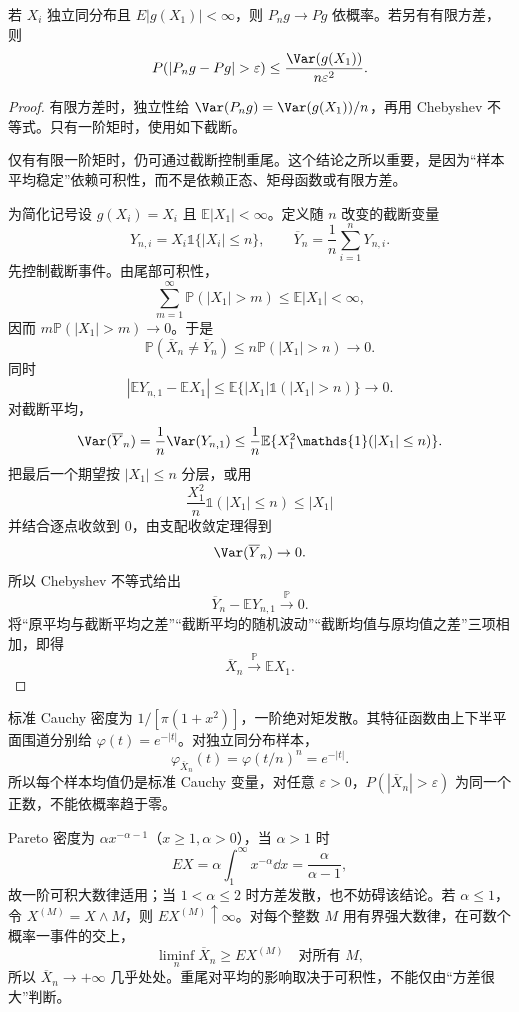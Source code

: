 \begin{theorem}
若 $X_i$ 独立同分布且 $E|g(X_1)|<\infty$，则 $P_ng\to Pg$ 依概率。若另有有限方差，则
\[
 P(|P_ng-Pg|>\varepsilon)\le\frac{\Var(g(X_1))}{n\varepsilon^2}.
\]
\end{theorem}
\begin{proof}
有限方差时，独立性给 $\Var(P_ng)=\Var(g(X_1))/n$，再用 Chebyshev 不等式。只有一阶矩时，使用如下截断。

仅有有限一阶矩时，仍可通过截断控制重尾。这个结论之所以重要，是因为“样本平均稳定”依赖可积性，而不是依赖正态、矩母函数或有限方差。

为简化记号设 $g(X_i)=X_i$ 且 $\mathbb E|X_1|<\infty$。定义随 $n$ 改变的截断变量
\[
 Y_{n,i}=X_i\mathds{1}\{|X_i|\le n\},
 \qquad
 \overline Y_n=\frac1n\sum_{i=1}^nY_{n,i}.
\]
先控制截断事件。由尾部可积性，
\[
 \sum_{m=1}^\infty \mathbb P(|X_1|>m)
 \le \mathbb E|X_1|<\infty,
\]
因而 $m\mathbb P(|X_1|>m)\to0$。于是
\[
 \mathbb P(\overline X_n\ne\overline Y_n)
 \le n\mathbb P(|X_1|>n)\to0.
\]
同时
\[
 |\mathbb E Y_{n,1}-\mathbb E X_1|
 \le\mathbb E\{|X_1|\mathds{1}(|X_1|>n)\}\to0.
\]
对截断平均，
\[
 \Var(\overline Y_n)
 =\frac1n\Var(Y_{n,1})
 \le\frac1n\mathbb E\{X_1^2\mathds{1}(|X_1|\le n)\}.
\]
把最后一个期望按 $|X_1|\le n$ 分层，或用
\[
 \frac{X_1^2}{n}\mathds{1}(|X_1|\le n)
 \le |X_1|
\]
并结合逐点收敛到 $0$，由支配收敛定理得到
\[
 \Var(\overline Y_n)\to0.
\]
所以 Chebyshev 不等式给出
\[
 \overline Y_n-\mathbb E Y_{n,1}\xrightarrow{\mathbb P}0.
\]
将“原平均与截断平均之差”“截断平均的随机波动”“截断均值与原均值之差”三项相加，即得
\[
 \overline X_n\xrightarrow{\mathbb P}\mathbb E X_1.
\]

\end{proof}

\begin{exbox}[重尾样本平均的两种行为]
标准 Cauchy 密度为 $1/[\pi(1+x^2)]$，一阶绝对矩发散。其特征函数由上下半平面围道分别给 $\varphi(t)=e^{-|t|}$。对独立同分布样本，
\[
 \varphi_{\overline X_n}(t)=\varphi(t/n)^n=e^{-|t|}.
\]
所以每个样本均值仍是标准 Cauchy 变量，对任意 $\varepsilon>0$，$P(|\overline X_n|>\varepsilon)$ 为同一个正数，不能依概率趋于零。

Pareto 密度为 $\alpha x^{-\alpha-1}$（$x\ge1,\alpha>0$），当 $\alpha>1$ 时
\[
 EX=\alpha\int_1^\infty x^{-\alpha}\dd x=\frac\alpha{\alpha-1},
\]
故一阶可积大数律适用；当 $1<\alpha\le2$ 时方差发散，也不妨碍该结论。若 $\alpha\le1$，令 $X^{(M)}=X\wedge M$，则 $EX^{(M)}\uparrow\infty$。对每个整数 $M$ 用有界强大数律，在可数个概率一事件的交上，
\[
 \liminf_n\overline X_n\ge EX^{(M)}\quad\text{对所有 }M,
\]
所以 $\overline X_n\to+\infty$ 几乎处处。重尾对平均的影响取决于可积性，不能仅由“方差很大”判断。
\end{exbox}


